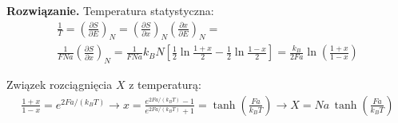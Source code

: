 \documentclass[11pt,a4paper]{article}
\newenvironment{solution}{\vspace{1cm} \par\textbf{Rozwiązanie.} \vspace{1cm}}{}
\begin{document}
\begin{solution}
Temperatura statystyczna:
\begin{align*}
\frac{1}{T} = \left( \frac{\partial S}{\partial E} \right)_N = 
\left( \frac{\partial S}{\partial x} \right)_N \left( \frac{\partial x}{\partial E} \right)_N = \\
\frac{1}{FNa} \left( \frac{\partial S}{\partial x} \right)_N = 
\frac{1}{FNa} k_B N \left[ \frac{1}{2}\ln\frac{1+x}{2} - \frac{1}{2}\ln\frac{1-x}{2} \right] =
\frac{k_B}{2Fa} \ln \left( \frac{1+x}{1-x} \right)
\end{align*}

Związek rozciągnięcia $X$ z temperaturą:
\begin{align*}
\frac{1+x}{1-x} = e^{2Fa/(k_B T)} \to
x = \frac{e^{2Fa/(k_B T)} - 1}{e^{2Fa/(k_B T)} + 1} = \tanh\left(\frac{Fa}{k_B T}\right) \to
X = Na\,\tanh\left(\frac{Fa}{k_B T}\right)
\end{align*}


\newpage
\end{solution}

\end{document}
